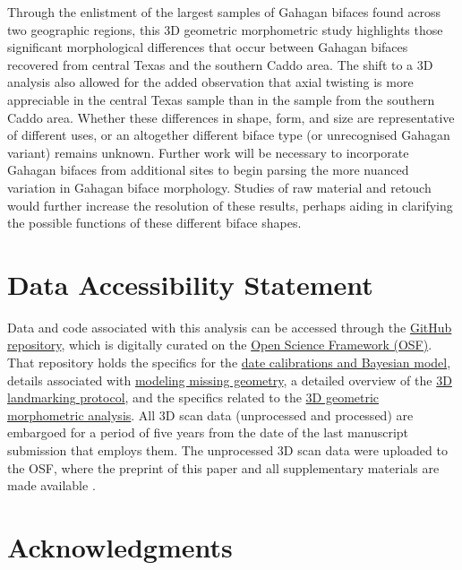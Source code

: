 \documentclass[review]{elsarticle}
\begin{document}
Through the enlistment of the largest samples of Gahagan bifaces found across two geographic regions, this 3D geometric morphometric study highlights those significant morphological differences that occur between Gahagan bifaces recovered from central Texas and the southern Caddo area. The shift to a 3D analysis also allowed for the added observation that axial twisting is more appreciable in the central Texas sample than in the sample from the southern Caddo area. Whether these differences in shape, form, and size are representative of different uses, or an altogether different biface type (or unrecognised Gahagan variant) remains unknown. Further work will be necessary to incorporate Gahagan bifaces from additional sites to begin parsing the more nuanced variation in Gahagan biface morphology. Studies of raw material and retouch would further increase the resolution of these results, perhaps aiding in clarifying the possible functions of these different biface shapes.

\section*{Data Accessibility Statement}

Data and code associated with this analysis can be accessed through the \href{https://github.com/aksel-blaise/gahaganmorph2}{GitHub repository}, which is digitally curated on the \href{https://osf.io/2g95w/}{Open Science Framework (OSF)}. That repository holds the specifics for the \href{https://github.com/aksel-blaise/gahaganmorph2/blob/master/analysis/gahagan14c.md}{date calibrations and Bayesian model}, details associated with \href{https://github.com/aksel-blaise/gahaganmorph2/blob/master/analysis/modeling-geometry.md}{modeling missing geometry}, a detailed overview of the \href{https://github.com/aksel-blaise/gahaganmorph2/blob/master/analysis/landmarking-protocol.md}{3D landmarking protocol}, and the specifics related to the \href{https://github.com/aksel-blaise/gahaganmorph2/blob/master/analysis/base-analysis.md}{3D geometric morphometric analysis}. All 3D scan data (unprocessed and processed) are embargoed for a period of five years from the date of the last manuscript submission that employs them. The unprocessed 3D scan data were uploaded to the OSF, where the preprint of this paper and all supplementary materials are made available \citep{RN20850}.

\section*{Acknowledgments}
\end{document}
